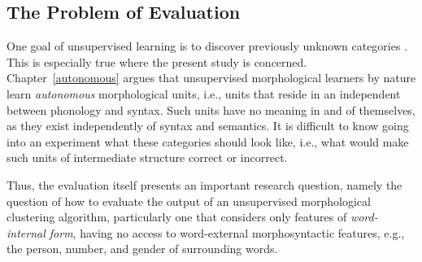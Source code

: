 \begin{definition}

\subsection{The Problem of Evaluation}  One goal of unsupervised learning is to discover previously unknown categories \citep{parsons:2004}. This is especially true where the present study is concerned. Chapter~\ref{autonomous} argues that unsupervised morphological learners by nature learn \emph{autonomous} morphological units, i.e., units that reside in an independent between phonology and syntax. Such units have no meaning in and of themselves, as they exist independently of syntax and semantics. It is difficult to know going into an experiment what these categories should look like, i.e., what would make such units of intermediate structure correct or incorrect. 

%

Thus, the evaluation itself presents an important research question, namely the question of how to evaluate the output of an unsupervised morphological clustering algorithm, particularly one that considers only features of \emph{word-internal form}, having no access to word-external morphosyntactic features, e.g., the person, number, and gender of surrounding words. 


\end{definition}
